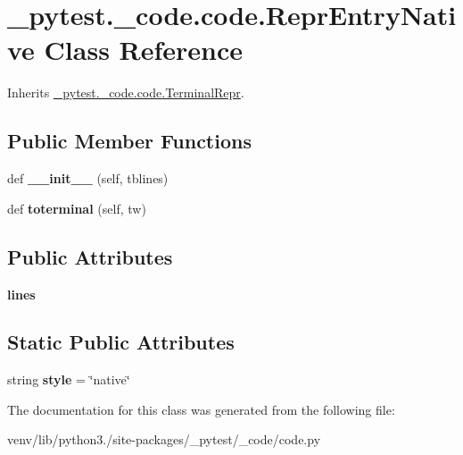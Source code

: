 \hypertarget{class__pytest_1_1__code_1_1code_1_1_repr_entry_native}{}\section{\+\_\+pytest.\+\_\+code.\+code.\+Repr\+Entry\+Native Class Reference}
\label{class__pytest_1_1__code_1_1code_1_1_repr_entry_native}


Inherits \hyperlink{class__pytest_1_1__code_1_1code_1_1_terminal_repr}{\+\_\+pytest.\+\_\+code.\+code.\+Terminal\+Repr}.

\subsection*{Public Member Functions}
\begin{DoxyCompactItemize}
\item 
\mbox{\label{class__pytest_1_1__code_1_1code_1_1_repr_entry_native_ad0a7abba7114e983e97829db6b6ca9ba}} 
def {\bfseries \+\_\+\+\_\+init\+\_\+\+\_\+} (self, tblines)
\item 
\mbox{\label{class__pytest_1_1__code_1_1code_1_1_repr_entry_native_a616fd49b30ad42ab66bb349b33d3bc04}} 
def {\bfseries toterminal} (self, tw)
\end{DoxyCompactItemize}
\subsection*{Public Attributes}
\begin{DoxyCompactItemize}
\item 
\mbox{\label{class__pytest_1_1__code_1_1code_1_1_repr_entry_native_ad7e7d0f900bf945f9455a867ea6fa318}} 
{\bfseries lines}
\end{DoxyCompactItemize}
\subsection*{Static Public Attributes}
\begin{DoxyCompactItemize}
\item 
\mbox{\label{class__pytest_1_1__code_1_1code_1_1_repr_entry_native_a95be3db75501deed3c26d07ad0bc4a0f}} 
string {\bfseries style} = \char`\"{}native\char`\"{}
\end{DoxyCompactItemize}


The documentation for this class was generated from the following file\+:\begin{DoxyCompactItemize}
\item 
venv/lib/python3./site-\/packages/\+\_\+pytest/\+\_\+code/code.\+py\end{DoxyCompactItemize}
